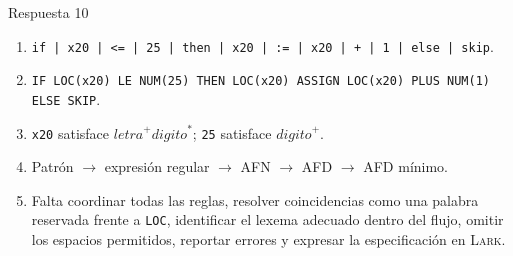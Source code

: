 \documentclass[11pt,spanish]{article}
\begin{document}
\ifrespuestas
\begin{respuesta}{Respuesta 10}
\begin{enumerate}[leftmargin=*]
    \item \texttt{if | x20 | <= | 25 | then | x20 | := | x20 | + | 1 | else | skip}.
    \item \texttt{IF LOC(x20) LE NUM(25) THEN LOC(x20) ASSIGN LOC(x20) PLUS NUM(1) ELSE SKIP}.
    \item \texttt{x20} satisface \(\mathit{letra}^{+}\mathit{digito}^{*}\); \texttt{25} satisface \(\mathit{digito}^{+}\).
    \item Patrón \(\longrightarrow\) expresión regular \(\longrightarrow\) AFN \(\longrightarrow\) AFD \(\longrightarrow\) AFD mínimo.
    \item Falta coordinar todas las reglas, resolver coincidencias como una palabra reservada frente a \texttt{LOC}, identificar el lexema adecuado dentro del flujo, omitir los espacios permitidos, reportar errores y expresar la especificación en \textsc{Lark}.
\end{enumerate}
\end{respuesta}
\fi
\end{document}
